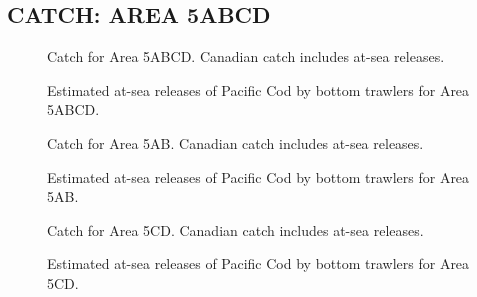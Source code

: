\documentclass[11pt]{book}
\begin{document}
\hypertarget{sec:figures}{%
\subsection{CATCH: AREA 5ABCD}\label{sec:figures}}
\begin{figure}[htb]

{\centering {} 

}

\caption{Catch for Area 5ABCD. Canadian catch includes at-sea releases.}\label{fig:fig-catch-5abcd}
\end{figure}
\begin{figure}[htb]

{\centering {} 

}

\caption{Estimated at-sea releases of Pacific Cod by bottom trawlers for Area 5ABCD.}\label{fig:fig-discards-5abcd}
\end{figure}
\begin{figure}[htb]

{\centering {} 

}

\caption{Catch for Area 5AB. Canadian catch includes at-sea releases.}\label{fig:fig-catch-5ab}
\end{figure}
\begin{figure}[htb]

{\centering {} 

}

\caption{Estimated at-sea releases of Pacific Cod by bottom trawlers for Area 5AB.}\label{fig:fig-discards-5ab}
\end{figure}
\begin{figure}[htb]

{\centering {} 

}

\caption{Catch for Area 5CD. Canadian catch includes at-sea releases.}\label{fig:fig-catch-5cd}
\end{figure}
\begin{figure}[htb]

{\centering {} 

}

\caption{Estimated at-sea releases of Pacific Cod by bottom trawlers for Area 5CD.}\label{fig:fig-discards-5cd}
\end{figure}
\clearpage
\end{document}
